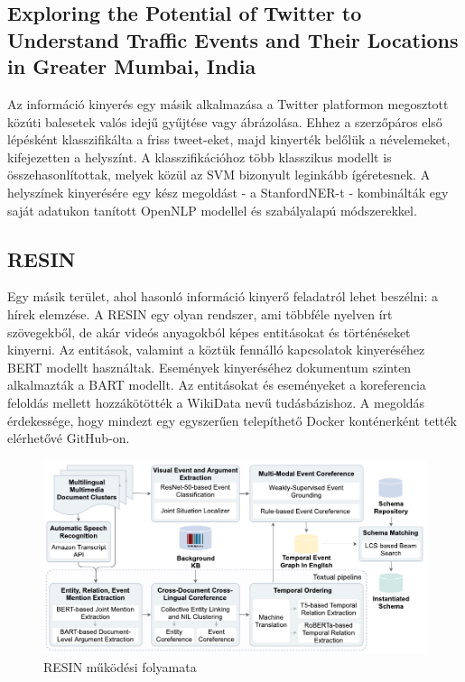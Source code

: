 \subsection{Exploring the Potential of Twitter to Understand Traffic Events and Their Locations in Greater Mumbai, India \cite{twitter-traffic}}

Az információ kinyerés egy másik alkalmazása a Twitter platformon megosztott közúti balesetek valós idejű gyűjtése vagy ábrázolása. Ehhez a szerzőpáros első lépésként klasszifikálta a friss tweet-eket, majd kinyerték belőlük a névelemeket, kifejezetten a helyszínt. A klasszifikációhoz több klasszikus modellt is összehasonlítottak, melyek közül az SVM bizonyult leginkább ígéretesnek. A helyszínek kinyerésére egy kész megoldást - a StanfordNER-t - kombinálták egy saját adatukon tanított OpenNLP modellel és szabályalapú módszerekkel.

\subsection{RESIN \cite{resin}}

Egy másik terület, ahol hasonló információ kinyerő feladatról lehet beszélni: a hírek elemzése. A RESIN egy olyan rendszer, ami többféle nyelven írt szövegekből, de akár videós anyagokból képes entitásokat és történéseket kinyerni. Az entitások, valamint a köztük fennálló kapcsolatok kinyeréséhez BERT modellt használtak. Események kinyeréséhez dokumentum szinten alkalmazták a BART modellt. Az entitásokat és eseményeket a koreferencia feloldás mellett hozzákötötték a WikiData nevű tudásbázishoz. A megoldás érdekessége, hogy mindezt egy egyszerűen telepíthető Docker konténerként tették elérhetővé GitHub-on.

\begin{figure}[H]
	\centering
	\includegraphics[width=1\textwidth]{figures/resin.pdf}
	\caption{RESIN működési folyamata \cite{resin}}
\end{figure}

